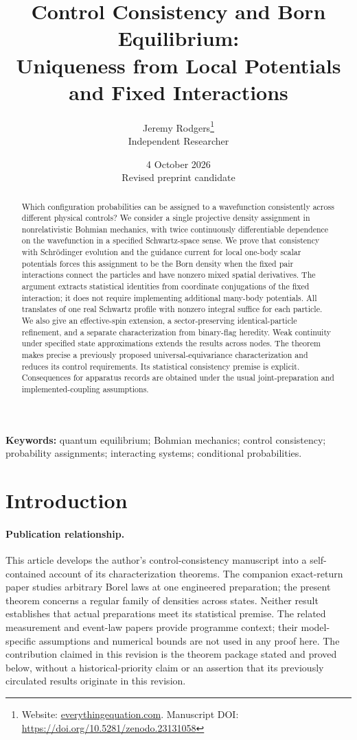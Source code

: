 \documentclass[11pt]{article}
\title{Control Consistency and Born Equilibrium:\\
Uniqueness from Local Potentials and Fixed Interactions}
\author{Jeremy Rodgers\thanks{Website: \href{https://everythingequation.com}{everythingequation.com}. Manuscript DOI: \url{https://doi.org/10.5281/zenodo.23131058}}\\\small Independent Researcher}
\date{4 October 2026\\\small Revised preprint candidate}
\numberwithin{equation}{section}
\theoremstyle{definition}
\begin{document}
\maketitle

\begin{abstract}
Which configuration probabilities can be assigned to a wavefunction consistently across different physical controls? We consider a single projective density assignment in nonrelativistic Bohmian mechanics, with twice continuously differentiable dependence on the wavefunction in a specified Schwartz-space sense. We prove that consistency with Schr\"odinger evolution and the guidance current for local one-body scalar potentials forces this assignment to be the Born density when the fixed pair interactions connect the particles and have nonzero mixed spatial derivatives. The argument extracts statistical identities from coordinate conjugations of the fixed interaction; it does not require implementing additional many-body potentials. All translates of one real Schwartz profile with nonzero integral suffice for each particle. We also give an effective-spin extension, a sector-preserving identical-particle refinement, and a separate characterization from binary-flag heredity. Weak continuity under specified state approximations extends the results across nodes. The theorem makes precise a previously proposed universal-equivariance characterization and reduces its control requirements. Its statistical consistency premise is explicit. Consequences for apparatus records are obtained under the usual joint-preparation and implemented-coupling assumptions.
\end{abstract}

\noindent\textbf{Keywords:} quantum equilibrium; Bohmian mechanics; control consistency; probability assignments; interacting systems; conditional probabilities.

\section{Introduction}
\paragraph{Publication relationship.}
This article develops the author's control-consistency manuscript into a self-contained account of its characterization theorems. The companion exact-return paper \cite{PortfolioReturn} studies arbitrary Borel laws at one engineered preparation; the present theorem concerns a regular family of densities across states. Neither result establishes that actual preparations meet its statistical premise. The related measurement and event-law papers \cite{OriginalMassive,OriginalMonograph,OriginalPilot,PortfolioEquilibrium,PortfolioPilot,PortfolioRecords} provide programme context; their model-specific assumptions and numerical bounds are not used in any proof here. The contribution claimed in this revision is the theorem package stated and proved below, without a historical-priority claim or an assertion that its previously circulated results originate in this revision.
\end{document}

